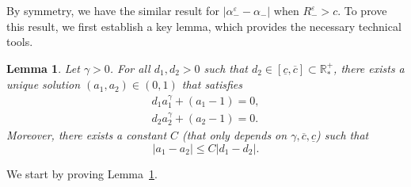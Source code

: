 \documentclass[11pt, twoside, a4paper]{article}
\theoremstyle{plain}
\newtheorem{lemma}[theorem]{Lemma}
\theoremstyle{remark}
\numberwithin{equation}{section}
\def\R{{\mathbb R}}%
\renewcommand{\leq}{\leqslant}\renewcommand{\le}{\leqslant}
\newcommand{\eps}{\varepsilon}
\begin{document}
By symmetry, we have the similar result for $|\alpha_-^\eps - \alpha_- |$ when $R_-^\eps > c$. To prove this result, we first establish a key lemma, which provides the necessary technical tools.

\begin{lemma}\label{technicalemma}
Let $\gamma >0$. For all $d_1, d_2 >0$ such that $d_2 \in [\underline{c},\overline{c}]\subset \R^+_*$, there exists a unique solution $(a_1,a_2) \in (0,1)$ that satisfies
\begin{align*}
 d_1 a_1^\gamma + (a_1-1) = 0,\\
 d_2 a_2^\gamma + (a_2-1) = 0.
\end{align*}
Moreover, there exists a constant $C$ (that only depends on $\gamma, \overline{c}, \underline{c}$) such that
\begin{equation*}
 \lvert a_1 - a_2 \rvert \leq C \lvert d_1 - d_2 \rvert.
\end{equation*}
\end{lemma}

We start by proving Lemma~\ref{technicalemma}.
\end{document}
